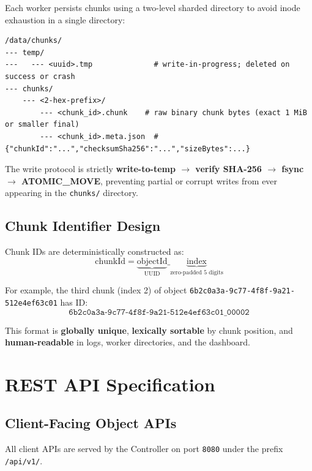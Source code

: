 \documentclass[12pt,a4paper]{report}
\begin{document}
Each worker persists chunks using a two-level sharded directory to avoid inode exhaustion in a single directory:

\begin{lstlisting}[style=bashStyle, caption=Worker on-disk layout for a chunk]
/data/chunks/
--- temp/
---   --- <uuid>.tmp              # write-in-progress; deleted on success or crash
--- chunks/
    --- <2-hex-prefix>/
        --- <chunk_id>.chunk    # raw binary chunk bytes (exact 1 MiB or smaller final)
        --- <chunk_id>.meta.json  # {"chunkId":"...","checksumSha256":"...","sizeBytes":...}
\end{lstlisting}

The write protocol is strictly \textbf{write-to-temp $\rightarrow$ verify SHA-256 $\rightarrow$ fsync $\rightarrow$ ATOMIC\_MOVE}, preventing partial or corrupt writes from ever appearing in the \texttt{chunks/} directory.

\section{Chunk Identifier Design}

Chunk IDs are deterministically constructed as:
\[
  \text{chunkId} = \underbrace{\text{objectId}}_{\text{UUID}} \texttt{\_} \underbrace{\text{index}}_{\text{zero-padded 5 digits}}
\]

For example, the third chunk (index 2) of object \texttt{6b2c0a3a-9c77-4f8f-9a21-512e4ef63c01} has ID:
\[
  \texttt{6b2c0a3a-9c77-4f8f-9a21-512e4ef63c01\_00002}
\]

This format is \textbf{globally unique}, \textbf{lexically sortable} by chunk position, and \textbf{human-readable} in logs, worker directories, and the dashboard.

\chapter{REST API Specification}

\section{Client-Facing Object APIs}

All client APIs are served by the Controller on port \texttt{8080} under the prefix \texttt{/api/v1/}.
\end{document}
